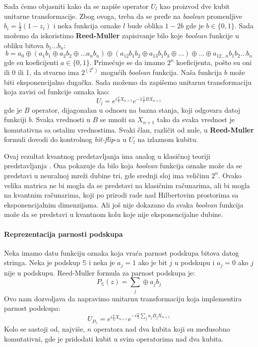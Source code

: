 \documentclass[12pt, letterpaper, oneside]{article}
\begin{document}
Sada ćemo objasniti kako da se napiše operator $U_l$ kao proizvod dve kubit unitarne transformacije. Zbog ovoga, treba da se pređe na \textit{boolean} promenljive $b_i=\frac{1}{2}(1-z_i)$ i 
neka funkcija oznake $l$ bude oblika $1-2b$ gde je $b \in \{0,1\}$. Sada možemo da iskoristimo \textbf{Reed-Muller} zapisivanje bilo koje \textit{boolean} funkcije u obliku bitova $b_1 \dots b_n$:
\[
    b = a_0 \oplus (a_1b_1 \oplus a_2b_2 \oplus \dots a_n b_n) \oplus (a_{12}b_1b_2 \oplus a_{13}b_1b_3 \oplus \dots) \oplus \dots \oplus a_{12 \dots n}b_1b_2 \dots b_n
\]
gde su koeficijenti $a \in \{0,1\}$. Primećuje se da imamo $2^n$ koeficijenta, pošto su oni ili 0 ili 1, da stvarno ima $2^{(2^n)}$ mogućih \textit{boolean} funkcija.
Naša funkcija $b$ može biti eksponencijalno dugačka. Sada možemo da zapišemo unitarnu transformaciju koja zavisi od funkcije oznaka kao:
\[
    U_l = e^{i\frac{\pi}{4}X_{n+1}}e^{-1\frac{\pi}{2}BX_{n+1}}
\]
gde je $B$ operator, dijagonalan u odnosu na bazna stanja, koji odgovara datoj funkciji $b$. 
Svaka vrednosti u $B$ se množi sa $X_{n+1}$ tako da svaka vrednost je komutativna sa ostalim vrednostima. 
Svaki član, različit od nule, u \textbf{Reed-Muller} formuli dovodi do kontrolnog \textit{bit-flip}-a u $U_l$ na izlaznom kubitu.

Ovaj rezultat kvantnog predstavljanja ima analog u klasičnoj teoriji predstavljanja \cite{Cybenko1989ApproximationBS}.
Ona pokazuje da bilo koja \textit{boolean} funkcija oznake može da se predstavi u neuralnoj mreži dubine tri, gde srednji sloj ima veličinu $2^n$.
Ovako velika matrica ne bi mogla da se predstavi na klasičnim računarima, ali bi mogla na kvantnim računarima, koji po prirodi rade
nad Hilbertovim prostorima sa eksponencijalnim dimenzijama. Ali još nije dokazano da svaka \textit{boolean} funkcija može da se predstavi u kvantnom kolu koje nije eksponencijalne dubine.

\paragraph*{Reprezentacija parnosti podskupa}
Neka imamo datu funkciju oznaka koja vraća parnost podskupa bitova datog stringa. Neka je podskup $\mathbb{S}$
i neka je $a_j=1$ ako je bit $j$ u podskupu i $a_j=0$ ako $j$ nije u podskupu. Reed-Muller formula za parnost podskupa je:
\[
    P_{\mathbb{S}}(z) = \sum_j \oplus a_j b_j
\]
Ovo nam dozvoljava da napravimo unitarnu transformaciju koja implementira parnost podskupa:
\[
    U_{P_{\mathbb{S}}} = e^{i\frac{\pi}{4}X_{n+1}}e^{-i\frac{\pi}{2}\sum_j a_jB_jX_{n+1}}
\]
Kolo se sastoji od, najviše, $n$ operatora nad dva kubita koji su međusobno komutativni, gde je pridodati kubit u svim operatorima nad dva kubita.
\end{document}
